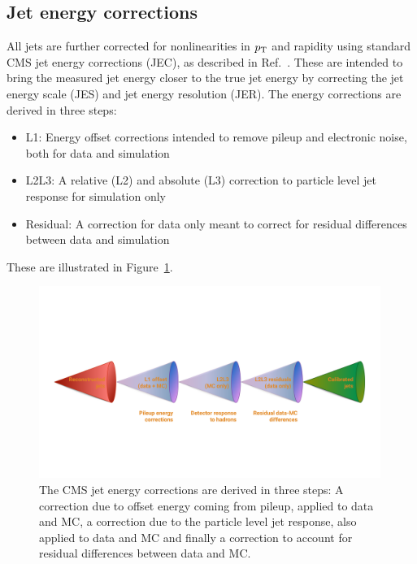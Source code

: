 \subsection{Jet energy corrections}
\label{sec:objreco:jec}
All jets are further corrected for nonlinearities in $p_{\mathrm{T}}$ and rapidity using standard CMS jet energy corrections (JEC), as described in Ref.~\cite{jme_jinst}. These are intended to bring the measured jet energy closer to the true jet energy by correcting the jet energy scale (JES) and jet energy resolution (JER). The energy corrections are derived in three steps:
\begin{itemize}
  \item L1: Energy offset corrections intended to remove pileup and electronic noise, both for data and simulation
  \item L2L3: A relative (L2) and absolute (L3) correction to particle level jet response for simulation only
  \item Residual: A correction for data only meant to correct for residual differences between data and simulation
\end{itemize}

These are illustrated in Figure~\ref{fig:objreco:jec}.

\begin{figure}[h]
    \centering
    \includegraphics[width=0.99\textwidth]{figures/event_reconstruction/JEC.pdf}
    \caption{The CMS jet energy corrections are derived in three steps: A correction due to offset energy coming from pileup, applied to data and MC, a correction due to the particle level jet response, also applied to data and MC and finally a correction to account for residual differences between data and MC.}
    \label{fig:objreco:jec}
\end{figure}

